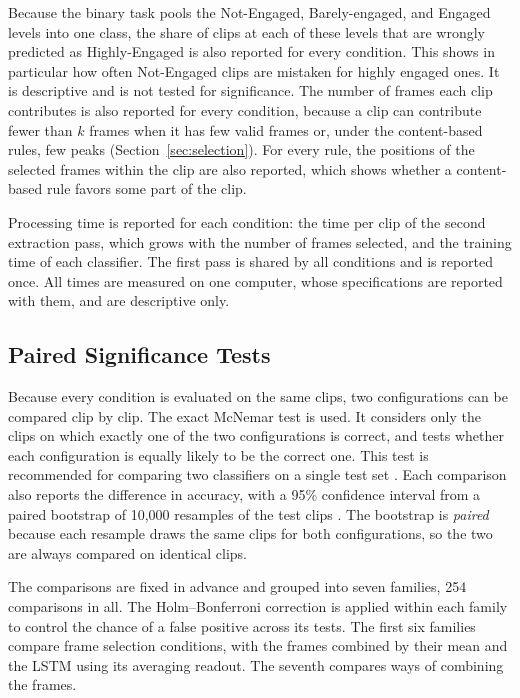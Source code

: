 Because the binary task pools the Not-Engaged, Barely-engaged, and Engaged levels into one class, the share of clips at each of these levels that are wrongly predicted as Highly-Engaged is also reported for every condition. This shows in particular how often Not-Engaged clips are mistaken for highly engaged ones. It is descriptive and is not tested for significance. The number of frames each clip contributes is also reported for every condition, because a clip can contribute fewer than $k$ frames when it has few valid frames or, under the content-based rules, few peaks (Section~\ref{sec:selection}). For every rule, the positions of the selected frames within the clip are also reported, which shows whether a content-based rule favors some part of the clip.

Processing time is reported for each condition: the time per clip of the second extraction pass, which grows with the number of frames selected, and the training time of each classifier. The first pass is shared by all conditions and is reported once. All times are measured on one computer, whose specifications are reported with them, and are descriptive only.

\subsection{Paired Significance Tests}

Because every condition is evaluated on the same clips, two configurations can be compared clip by clip. The exact McNemar test \cite{mcnemar1947} is used. It considers only the clips on which exactly one of the two configurations is correct, and tests whether each configuration is equally likely to be the correct one. This test is recommended for comparing two classifiers on a single test set \cite{dietterich1998}. Each comparison also reports the difference in accuracy, with a 95\% confidence interval from a paired bootstrap of 10,000 resamples of the test clips \cite{efron1993}. The bootstrap is \emph{paired} because each resample draws the same clips for both configurations, so the two are always compared on identical clips.

The comparisons are fixed in advance and grouped into seven families, 254 comparisons in all. The Holm--Bonferroni correction \cite{holm1979} is applied within each family to control the chance of a false positive across its tests. The first six families compare frame selection conditions, with the frames combined by their mean and the LSTM using its averaging readout. The seventh compares ways of combining the frames.

